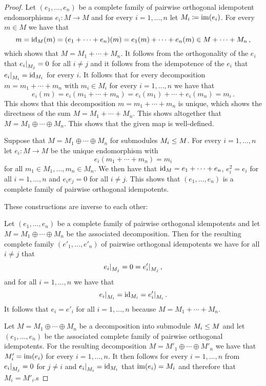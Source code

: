 \begin{proof}
  Let $(e_1, \dotsc, e_n)$ be a complete family of pairwise orthogonal idempotent endomorphisms $e_i \colon M \to M$ and for every $i = 1, \dotsc, n$ let $M_i \coloneqq \operatorname{im}(e_i)$.
  For every $m \in M$ we have that
  \[
        m
    =   \operatorname{id}_M(m)
    =   (e_1 + \dotsb + e_n)(m)
    =   e_1(m) + \dotsb + e_n(m)
    \in M + \dotsb + M_n \,,
  \]
  which shows that $M = M_1 + \dotsb + M_n$.
  It follows from the orthogonality of the $e_i$ that $\restrict{e_i}{M_j} = 0$ for all $i \neq j$ and it follows from the idempotence of the $e_i$ that $\restrict{e_i}{M_i} = \id_{M_i}$ for every $i$.
  It follows that for every decomposition $m = m_1 + \dotsb + m_n$ with $m_i \in M_i$ for every $i = 1, \dotsc, n$ we have that
  \[
      e_i(m)
    = e_i(m_1 + \dotsb + m_n)
    = e_i(m_1) + \dotsb + e_i(m_n)
    = m_i \,.
  \]
  This shows that this decomposition $m = m_1 + \dotsb + m_n$ is unique, which shows the directness of the sum $M = M_1 + \dotsb + M_n$.
  This shows altogether that $M = M_1 \oplus \dotsb \oplus M_n$.
  This shows that the given map is well-defined.
  
  Suppose that $M = M_1 \oplus \dotsb \oplus M_n$ for submodules $M_i \leq M$.
  For every $i = 1, \dotsc, n$ let $e_i \colon M \to M$ be the unique endomorphism with
  \[
      e_i(m_1 + \dotsb + m_n)
    = m_i
  \]
  for all $m_1 \in M_1, \dotsc, m_n \in M_n$.
  We then have that $\operatorname{id}_M = e_1 + \dotsb + e_n$, $e_i^2 = e_i$ for all $i = 1, \dotsc, n$ and $e_i e_j = 0$ for all $i \neq j$.
  This shows that $(e_1, \dotsc, e_n)$ is a complete family of pairwise orthogonal idempotents.
  
  These constructions are inverse to each other:
  
  Let $(e_1, \dotsc, e_n)$ be a complete family of pairwise orthogonal idempotents and let $M = M_1 \oplus \dotsb \oplus M_n$ be the associated decomposition.
  Then for the resulting complete family $(e'_1, \dotsc, e'_n)$ of pairwise orthogonal idempotents we have for all $i \neq j$ that
  \[
      \restrict{e_i}{M_j}
    = 0
    = \restrict{e'_i}{M_j} \,,
  \]
  and for all $i = 1, \dotsc, n$ we have that
  \[
      \restrict{e_i}{M_i}
    = \id_{M_i}
    = \restrict{e'_i}{M_i} \,.
  \]
  It follows that $e_i = e'_i$ for all $i = 1, \dotsc, n$ because $M = M_1 + \dotsb + M_n$.
  
  Let $M = M_1 \oplus \dotsb \oplus M_n$ be a decomposition into submodule $M_i \leq M$ and let $(e_1, \dotsc, e_n)$ be the associated complete family of pairwise orthogonal idempotents.
  For the resulting decomposition $M = M'_1 \oplus \dotsb \oplus M'_n$ we have that $M'_i = \operatorname{im}(e_i)$ for every $i = 1, \dotsc, n$.
  It then follows for every $i = 1, \dotsc, n$ from $\restrict{e_i}{M_j} = 0$ for $j \neq i$ and $\restrict{e_i}{M_i} = \id_{M_i}$ that $\operatorname{im}(e_i) = M_i$ and therefore that $M_i = M'_i$.s
\end{proof}


